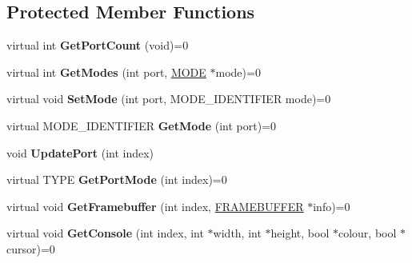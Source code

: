 \subsection*{Protected Member Functions}
\begin{DoxyCompactItemize}
\item 
\mbox{\label{class_generic_video_a024f3e13dfe826a93d4d0ae0bd0f6794}} 
virtual int {\bfseries Get\+Port\+Count} (void)=0
\item 
\mbox{\label{class_generic_video_aab4172455afed5a027bb0cafdce0afb1}} 
virtual int {\bfseries Get\+Modes} (int port, \hyperlink{struct_generic_video_1_1_m_o_d_e}{M\+O\+DE} $\ast$mode)=0
\item 
\mbox{\label{class_generic_video_ad4f59851a53d5f54524aacd7ad8a3b45}} 
virtual void {\bfseries Set\+Mode} (int port, M\+O\+D\+E\+\_\+\+I\+D\+E\+N\+T\+I\+F\+I\+ER mode)=0
\item 
\mbox{\label{class_generic_video_a2d74e1db238df01cd93c0c49126c708d}} 
virtual M\+O\+D\+E\+\_\+\+I\+D\+E\+N\+T\+I\+F\+I\+ER {\bfseries Get\+Mode} (int port)=0
\item 
\mbox{\label{class_generic_video_a86caece1005aff6d1db7bf6a786e7b64}} 
void {\bfseries Update\+Port} (int index)
\item 
\mbox{\label{class_generic_video_a9bab0c388d4d797c18aa68e057cb7cf6}} 
virtual T\+Y\+PE {\bfseries Get\+Port\+Mode} (int index)=0
\item 
\mbox{\label{class_generic_video_a6ec5a1ecef3f99c82fde3d71e7852781}} 
virtual void {\bfseries Get\+Framebuffer} (int index, \hyperlink{struct_generic_video_1_1_f_r_a_m_e_b_u_f_f_e_r}{F\+R\+A\+M\+E\+B\+U\+F\+F\+ER} $\ast$info)=0
\item 
\mbox{\label{class_generic_video_acf564daaf7cb4bda77d972997524dc62}} 
virtual void {\bfseries Get\+Console} (int index, int $\ast$width, int $\ast$height, bool $\ast$colour, bool $\ast$cursor)=0
\item 
\mbox{\label{class_generic_video_a743a1bef0b284e26b24edd5f5e8d1550}} 

\end{DoxyCompactItemize}

